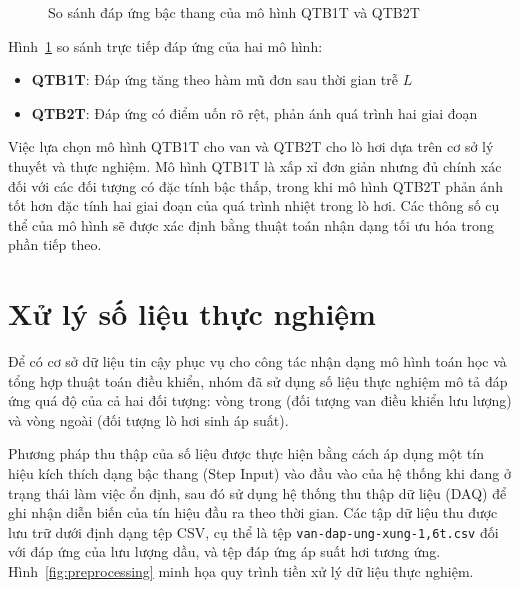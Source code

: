\documentclass[../main.tex]{subfiles}
\begin{document}
\begin{figure}[H]
    \caption{So sánh đáp ứng bậc thang của mô hình QTB1T và QTB2T}
    \label{fig:qtb1t_vs_qtb2t}
\end{figure}

Hình~\ref{fig:qtb1t_vs_qtb2t} so sánh trực tiếp đáp ứng của hai mô hình:
\begin{itemize}
    \item \textbf{QTB1T}: Đáp ứng tăng theo hàm mũ đơn sau thời gian trễ $L$
    \item \textbf{QTB2T}: Đáp ứng có điểm uốn rõ rệt, phản ánh quá trình hai giai đoạn
\end{itemize}

Việc lựa chọn mô hình QTB1T cho van và QTB2T cho lò hơi dựa trên cơ sở lý thuyết và thực nghiệm. Mô hình QTB1T là xấp xỉ đơn giản nhưng đủ chính xác đối với các đối tượng có đặc tính bậc thấp, trong khi mô hình QTB2T phản ánh tốt hơn đặc tính hai giai đoạn của quá trình nhiệt trong lò hơi. Các thông số cụ thể của mô hình sẽ được xác định bằng thuật toán nhận dạng tối ưu hóa trong phần tiếp theo.

\section{Xử lý số liệu thực nghiệm}

Để có cơ sở dữ liệu tin cậy phục vụ cho công tác nhận dạng mô hình toán học và tổng hợp thuật toán điều khiển, nhóm đã sử dụng số liệu thực nghiệm mô tả đáp ứng quá độ của cả hai đối tượng: vòng trong (đối tượng van điều khiển lưu lượng) và vòng ngoài (đối tượng lò hơi sinh áp suất).

Phương pháp thu thập của số liệu được thực hiện bằng cách áp dụng một tín hiệu kích thích dạng bậc thang (Step Input) vào đầu vào của hệ thống khi đang ở trạng thái làm việc ổn định, sau đó sử dụng hệ thống thu thập dữ liệu (DAQ) để ghi nhận diễn biến của tín hiệu đầu ra theo thời gian. Các tập dữ liệu thu được lưu trữ dưới định dạng tệp CSV, cụ thể là tệp {\footnotesize\texttt{van-dap-ung-xung-1,6t.csv}} đối với đáp ứng của lưu lượng dầu, và tệp đáp ứng áp suất hơi tương ứng. Hình~\ref{fig:preprocessing} minh họa quy trình tiền xử lý dữ liệu thực nghiệm.
\end{document}
